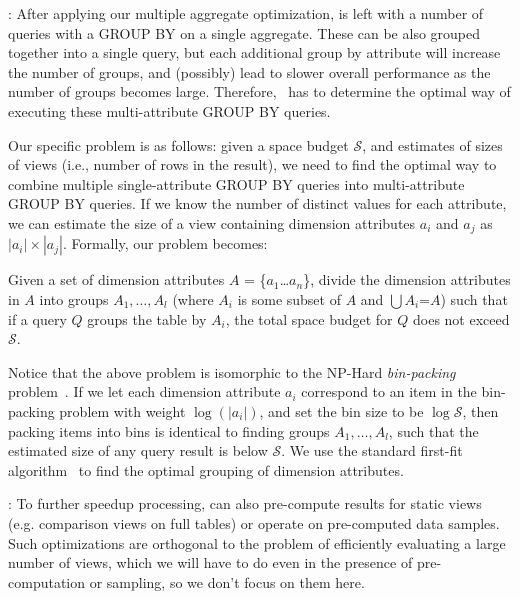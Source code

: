 :
After applying our multiple aggregate optimization, \SeeDB is left with a number of 
queries with a GROUP BY on a single aggregate.
These can be also grouped together into a single query, but each additional 
group by attribute will increase the number of groups, and (possibly) lead to slower
overall performance as the number of groups becomes large.  
Therefore, \SeeDB\ has to determine the optimal way of executing these multi-attribute
GROUP BY queries.

Our specific problem is as follows: given a space budget $\mathcal{S}$,
and estimates of sizes of views (i.e., number of rows in the result), we need to find the optimal
way to combine multiple single-attribute GROUP BY queries into multi-attribute GROUP BY queries.
If we know the number of distinct values for each attribute, we can estimate the
size of a view containing dimension attributes $a_i$ and $a_j$ as $|a_i|\times |a_j|$.
Formally, our problem becomes:
\vspace{-5pt}
\begin{problem}
Given a set of dimension attributes $A$ = \{$a_1$\ldots$a_n$\}, divide the
dimension attributes in $A$ into groups $A_1, \ldots, A_l$ (where $A_i$ is some
subset of $A$ and $\bigcup A_i$=$A$) such that if a query $Q$ groups the table by $A_i$, 
the total space budget for $Q$ does not exceed $\mathcal{S}$.
\vspace{-5pt}
\end{problem}

Notice that the above problem is isomorphic to the NP-Hard {\em bin-packing} problem~\cite{garey}.
If we let each dimension attribute
$a_i$ correspond to an item in the bin-packing problem with weight $\log (|a_i|)$,
and set the bin size to be $\log \mathcal{S}$,
then packing items into bins is identical to finding groups $A_1, \ldots, A_l$,
such that the estimated size of any query result is below $\mathcal{S}$.
We use the standard first-fit algorithm~\cite{first-fit} to find the optimal
grouping of dimension attributes.

: 
To further speedup processing, \SeeDB can also pre-compute results for 
static views (e.g. comparison views on full tables) or operate on
pre-computed data samples.  Such optimizations are orthogonal to the
problem of efficiently evaluating a large number of views, which we will have to
do even in the presence of pre-computation or sampling, so we don't focus on them here.



